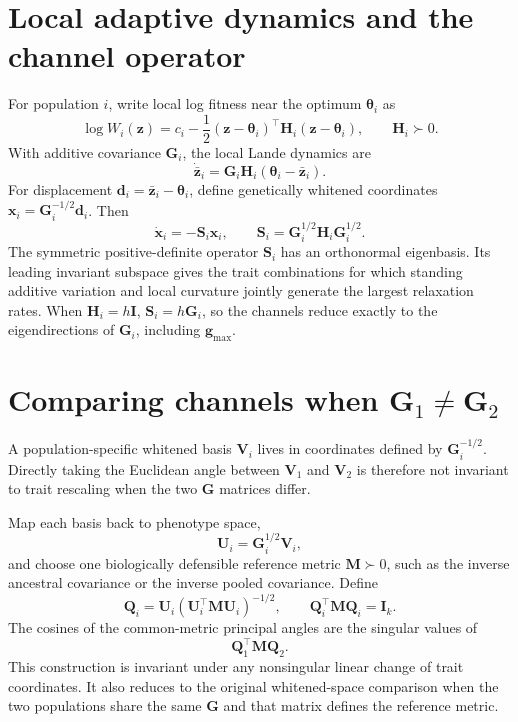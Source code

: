 \documentclass[11pt,a4paper]{article}
\newcommand{\G}{\mathbf G}
\newcommand{\Hh}{\mathbf H}
\newcommand{\Sop}{\mathbf S}
\newcommand{\Vv}{\mathbf V}
\newcommand{\Qq}{\mathbf Q}
\newcommand{\M}{\mathbf M}
\begin{document}
\section{Local adaptive dynamics and the channel operator}

For population \(i\), write local log fitness near the optimum \(\bm\theta_i\) as
\begin{equation}
\log W_i(\mathbf z)=c_i-\frac12(\mathbf z-\bm\theta_i)^\top\Hh_i(\mathbf z-\bm\theta_i),
\qquad \Hh_i\succ0.
\end{equation}
With additive covariance \(\G_i\), the local Lande dynamics are
\begin{equation}
\dot{\bar{\mathbf z}}_i=\G_i\Hh_i(\bm\theta_i-\bar{\mathbf z}_i).
\end{equation}
For displacement \(\mathbf d_i=\bar{\mathbf z}_i-\bm\theta_i\), define genetically whitened coordinates \(\mathbf x_i=\G_i^{-1/2}\mathbf d_i\). Then
\begin{equation}
\dot{\mathbf x}_i=-\Sop_i\mathbf x_i,
\qquad
\Sop_i=\G_i^{1/2}\Hh_i\G_i^{1/2}.
\end{equation}
The symmetric positive-definite operator \(\Sop_i\) has an orthonormal eigenbasis. Its leading invariant subspace gives the trait combinations for which standing additive variation and local curvature jointly generate the largest relaxation rates. When \(\Hh_i=h\mathbf I\), \(\Sop_i=h\G_i\), so the channels reduce exactly to the eigendirections of \(\G_i\), including \(\mathbf g_{\max}\).

\section{Comparing channels when \(\G_1\neq\G_2\)}

A population-specific whitened basis \(\Vv_i\) lives in coordinates defined by \(\G_i^{-1/2}\). Directly taking the Euclidean angle between \(\Vv_1\) and \(\Vv_2\) is therefore not invariant to trait rescaling when the two \(\G\) matrices differ.

Map each basis back to phenotype space,
\begin{equation}
\mathbf U_i=\G_i^{1/2}\Vv_i,
\end{equation}
and choose one biologically defensible reference metric \(\M\succ0\), such as the inverse ancestral covariance or the inverse pooled covariance. Define
\begin{equation}
\Qq_i=\mathbf U_i(\mathbf U_i^\top\M\mathbf U_i)^{-1/2},
\qquad \Qq_i^\top\M\Qq_i=\mathbf I_k.
\end{equation}
The cosines of the common-metric principal angles are the singular values of
\begin{equation}
\Qq_1^\top\M\Qq_2.
\end{equation}
This construction is invariant under any nonsingular linear change of trait coordinates. It also reduces to the original whitened-space comparison when the two populations share the same \(\G\) and that matrix defines the reference metric.
\end{document}
